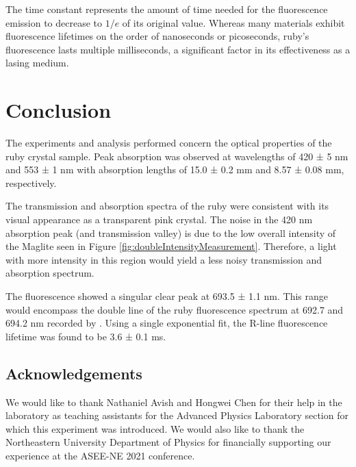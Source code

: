 \documentclass[11pt, a4paper, twocolumn]{article}
\begin{document}
The time constant represents the amount of time needed for the fluorescence emission to decrease to $1/e$ of its original value. Whereas many materials exhibit fluorescence lifetimes on the order of nanoseconds or picoseconds, ruby’s fluorescence lasts multiple milliseconds, a significant factor in its effectiveness as a lasing medium.

\section*{Conclusion}
The experiments and analysis performed concern the optical properties of the ruby crystal sample. Peak absorption was observed at wavelengths of 420 ± 5 nm and 553 ± 1 nm with absorption lengths of 15.0 ± 0.2 mm and 8.57 ± 0.08 mm, respectively. 

The transmission and absorption spectra of the ruby were consistent with its visual appearance as a transparent pink crystal. The noise in the 420 nm absorption peak (and transmission valley) is due to the low overall intensity of the Maglite seen in Figure \ref{fig:doubleIntensityMeasurement}. Therefore, a light with more intensity in this region would yield a less noisy transmission and absorption spectrum.

The fluorescence showed a singular clear peak at 693.5 ± 1.1 nm. This range would encompass the double line of the ruby fluorescence spectrum at 692.7 and 694.2 nm recorded by \cite{Kumari, Mani}. Using a single exponential fit, the R-line fluorescence lifetime was found to be 3.6 ± 0.1 ms.

\subsection*{Acknowledgements}
We would like to thank Nathaniel Avish and Hongwei Chen for their help in the laboratory as teaching assistants for the Advanced Physics Laboratory section for which this experiment was introduced. We would also like to thank the Northeastern University Department of Physics for financially supporting our experience at the ASEE-NE 2021 conference.
\nocite{*}

\footnotesize{}
\end{document}
